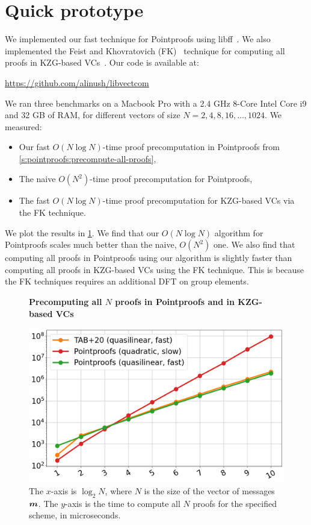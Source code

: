 \section{Quick prototype}

We implemented our fast technique for Pointproofs using \textsf{libff}~\cite{libff}.
We also implemented the Feist and Khovratovich (FK)~\cite{FK20} technique for computing all proofs in KZG-based VCs~\cite{TAB+20}.
Our code is available at:
\begin{center}
    \url{https://github.com/alinush/libvectcom}
\end{center}

\noindent We ran three benchmarks on a Macbook Pro with a 2.4 GHz 8-Core Intel Core i9 and 32 GB of RAM, for different vectors of size $N=2,4,8,16,\dots,1024$.
We measured:
\begin{itemize}
    \item Our fast $O(N\log{N})$-time proof precomputation in Pointproofs from \cref{s:pointproofs:precompute-all-proofs},
    \item The naive $O(N^2)$-time proof precomputation for Pointproofs,
    \item The fast $O(N\log{N})$-time proof precomputation for KZG-based VCs via the FK technique.
\end{itemize}

\noindent We plot the results in \cref{f:benchmarks}.
We find that our $O(N\log{N})$ algorithm for Pointproofs scales much better than the naive, $O(N^2)$ one.
We also find that computing all proofs in Pointproofs using our algorithm is slightly faster than computing all proofs in KZG-based VCs using the FK technique.
This is because the FK techniques requires an additional DFT on group elements.

\begin{figure}[t]
    \centering
    \textbf{Precomputing all $N$ proofs in Pointproofs and in KZG-based VCs}
    \par
    \medskip
    \includegraphics[width=0.50\columnwidth]{fk-vs-pointproofs.png}
    \caption{
        The $x$-axis is $\log_2{N}$, where $N$ is the size of the vector of messages $\bm{m}$.
        The $y$-axis is the time to compute all $N$ proofs for the specified scheme, in microseconds.
    }
    \label{f:benchmarks}
\end{figure}
